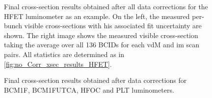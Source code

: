 \begin{figure}[!htb]
	\centering
	\caption[Final HFET cross-section results]{Final cross-section results obtained after all data corrections for the HFET luminometer as an example. On the left, the measured per-bunch visible cross-sections with his associated fit uncertainty are shown. The right image shows the measured visible cross-section taking the average over all 136 BCIDs for each vdM and im scan pairs. All statistics are determined as in \autoref{fig:no_Corr_xsec_results_HFET}.}
	\label{fig:all_Corr_xsec_results_HFET}
\end{figure}

\begin{figure}[!htb]
	\centering
	\caption[Final cross-section results for other online luminometers]{Final cross-section results obtained after data corrections for BCM1F, BCM1FUTCA, HFOC and PLT luminometers.}
	\label{fig:all_Corr_luminometer_xsec}
\end{figure}

